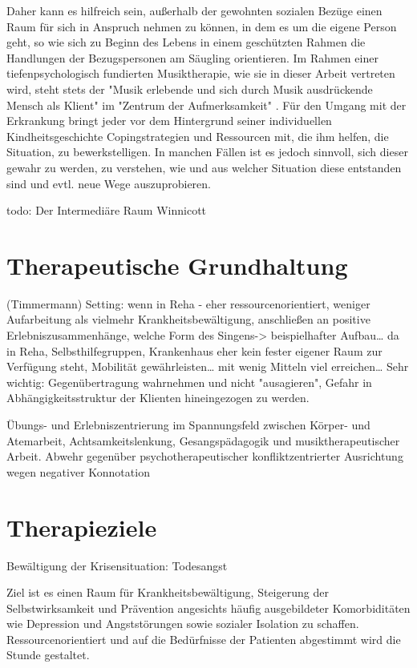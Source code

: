 Daher kann es hilfreich sein, außerhalb der gewohnten sozialen Bezüge einen Raum für sich in Anspruch nehmen zu können, in dem es um die eigene Person geht, so wie sich zu Beginn des Lebens in einem geschützten Rahmen die Handlungen der Bezugspersonen am Säugling orientieren. Im Rahmen einer tiefenpsychologisch fundierten Musiktherapie, wie sie in dieser Arbeit vertreten wird, steht stets der "Musik erlebende und sich durch Musik ausdrückende Mensch als Klient" im "Zentrum der Aufmerksamkeit" \autocite[4]{timmermann2004}. Für den Umgang mit der Erkrankung bringt jeder vor dem Hintergrund seiner individuellen Kindheitsgeschichte Copingstrategien und Ressourcen mit, die ihm helfen, die Situation, zu bewerkstelligen. In manchen Fällen ist es jedoch sinnvoll, sich dieser gewahr zu werden, zu verstehen, wie und aus welcher Situation diese entstanden sind und evtl. neue Wege auszuprobieren. 

todo: Der Intermediäre Raum Winnicott


\section{Therapeutische Grundhaltung} 
(Timmermann) Setting: wenn in Reha - eher ressourcenorientiert, weniger Aufarbeitung als vielmehr Krankheitsbewältigung, anschließen an positive Erlebniszusammenhänge, welche Form des Singens-> beispielhafter Aufbau… da in Reha, Selbsthilfegruppen, Krankenhaus eher kein fester eigener Raum zur Verfügung steht, Mobilität gewährleisten… mit wenig Mitteln viel erreichen…
Sehr wichtig: Gegenübertragung wahrnehmen und nicht "ausagieren", Gefahr in Abhängigkeitsstruktur der Klienten hineingezogen zu werden.

Übungs- und Erlebniszentrierung im Spannungsfeld zwischen Körper- und Atemarbeit, Achtsamkeitslenkung, Gesangspädagogik und musiktherapeutischer Arbeit. Abwehr gegenüber psychotherapeutischer konfliktzentrierter Ausrichtung wegen negativer Konnotation

\section{Therapieziele}
Bewältigung der Krisensituation: Todesangst 

Ziel ist es einen Raum für Krankheitsbewältigung, Steigerung der Selbstwirksamkeit und Prävention angesichts häufig ausgebildeter Komorbiditäten wie Depression und Angststörungen sowie sozialer Isolation zu schaffen. Ressourcenorientiert und auf die Bedürfnisse der Patienten abgestimmt wird die Stunde gestaltet.

